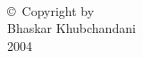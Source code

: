 
\thispagestyle{empty}
\hbox{\ }

\vfill
\renewcommand{\baselinestretch}{1}
\small\normalsize

\vspace{-.65in}

\begin{center}
\large{\copyright \hbox{ }Copyright by\\
Bhaskar Khubchandani  %
\\
2004}
\end{center}

\vfill

\newpage

\hbox{\ }
\newpage
